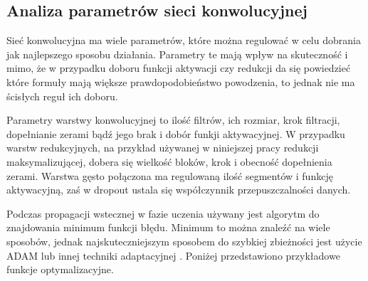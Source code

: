 \subsection{Analiza parametrów sieci konwolucyjnej}

Sieć konwolucyjna ma wiele parametrów, które można regulować w celu dobrania jak najlepszego sposobu działania. Parametry te mają wpływ na skuteczność i mimo, że w przypadku doboru funkcji aktywacji czy redukcji da się powiedzieć które formuły mają większe prawdopodobieństwo powodzenia, to jednak nie ma ścisłych reguł ich doboru.

Parametry warstwy konwolucyjnej to ilość filtrów, ich rozmiar, krok filtracji, dopełnianie zerami bądź jego brak i dobór funkji aktywacyjnej. W przypadku warstw redukcyjnych, na przykład używanej w niniejszej pracy redukcji maksymalizującej, dobera się wielkość bloków, krok i obecność dopełnienia zerami. Warstwa gęsto połączona ma regulowaną ilość segmentów i funkcję aktywacyjną, zaś w dropout ustala się współczynnik przepuszczalności danych.

Podczas propagacji wstecznej w fazie uczenia używany jest algorytm do znajdowania minimum funkcji błędu. Minimum to można znaleźć na wiele sposobów, jednak najskuteczniejszym sposobem do szybkiej zbieżności jest użycie ADAM lub innej techniki adaptacyjnej \cite{gradient_decent}. Poniżej przedstawiono przykładowe funkcje optymalizacyjne.

